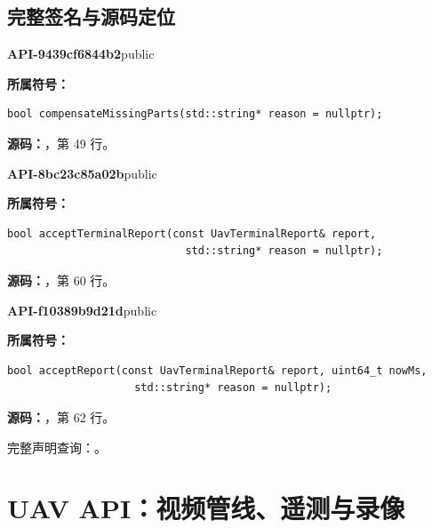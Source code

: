 \subsection{完整签名与源码定位}

\textbf{API-9439cf6844b2}\quad public\par
\textbf{所属符号：}\par
\begin{Verbatim}[fontsize=\footnotesize,breaklines,breakanywhere]
bool compensateMissingParts(std::string* reason = nullptr);
\end{Verbatim}
\textbf{源码：}，第 49 行。\par

\textbf{API-8bc23c85a02b}\quad public\par
\textbf{所属符号：}\par
\begin{Verbatim}[fontsize=\footnotesize,breaklines,breakanywhere]
bool acceptTerminalReport(const UavTerminalReport& report,
                            std::string* reason = nullptr);
\end{Verbatim}
\textbf{源码：}，第 60 行。\par

\textbf{API-f10389b9d21d}\quad public\par
\textbf{所属符号：}\par
\begin{Verbatim}[fontsize=\footnotesize,breaklines,breakanywhere]
bool acceptReport(const UavTerminalReport& report, uint64_t nowMs,
                    std::string* reason = nullptr);
\end{Verbatim}
\textbf{源码：}，第 62 行。\par

完整声明查询：。

\section{UAV API：视频管线、遥测与录像}

